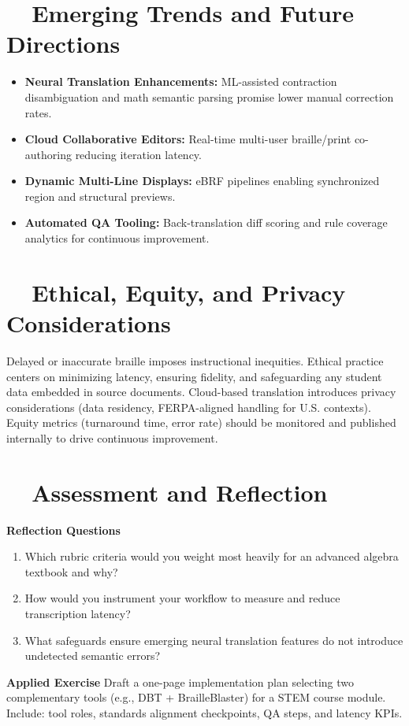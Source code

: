 \section{~~Emerging Trends and Future Directions}\label{ch12:sec:emerging-trends}
\begin{itemize}
	\item \textbf{Neural Translation Enhancements:} ML-assisted contraction disambiguation and math semantic parsing promise lower manual correction rates.
	\item \textbf{Cloud Collaborative Editors:} Real-time multi-user braille/print co-authoring reducing iteration latency.
	\item \textbf{Dynamic Multi-Line Displays:} eBRF pipelines enabling synchronized region  and structural previews.
	\item \textbf{Automated QA Tooling:} Back-translation diff scoring and rule coverage analytics for continuous improvement.
\end{itemize}

\section{~~Ethical, Equity, and Privacy Considerations}\label{ch12:sec:ethics-equity}
Delayed or inaccurate braille imposes instructional inequities. Ethical practice centers on minimizing latency, ensuring fidelity, and safeguarding any student data embedded in source documents. Cloud-based translation introduces privacy considerations (data residency, FERPA-aligned handling for U.S. contexts). Equity metrics (turnaround time, error rate) should be monitored and published internally to drive continuous improvement.

\section{~~Assessment and Reflection}\label{ch12:sec:assessment-reflection}
\textbf{Reflection Questions}
\begin{enumerate}
	\item Which rubric criteria would you weight most heavily for an advanced algebra textbook and why?
	\item How would you instrument your workflow to measure and reduce transcription latency?
	\item What safeguards ensure emerging neural translation features do not introduce undetected semantic errors?
\end{enumerate}
\textbf{Applied Exercise} Draft a one-page implementation plan selecting two complementary tools (e.g., DBT + BrailleBlaster) for a STEM course module. Include: tool roles, standards alignment checkpoints, QA steps, and latency KPIs.

